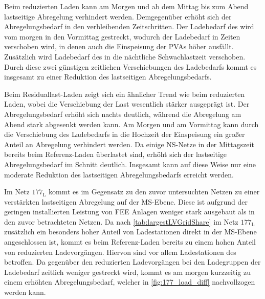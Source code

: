 Beim reduzierten Laden kann am Morgen und ab dem Mittag bis zum Abend lastseitige Abregelung verhindert werden.
Demgegenüber erhöht sich der Abregelungsbedarf in den verbleibenden Zeitschritten.
Der Ladebedarf des \UC \Firmeparkplatz wird vom morgen in den Vormittag gestreckt, wodurch der Ladebedarf in Zeiten verschoben wird, in denen auch die Einspeisung der \glspl{PVA} höher ausfällt.
Zusätzlich wird Ladebedarf des \UC \zH in die nächtliche Schwachlastzeit verschoben.
Durch diese zwei günstigen zeitlichen Verschiebungen des Ladebedarfs kommt es insgesamt zu einer Reduktion des lastseitigen Abregelungsbedarfs.



Beim Residuallast-Laden zeigt sich ein ähnlicher Trend wie beim reduzierten Laden, wobei die Verschiebung der Last wesentlich stärker ausgeprägt ist.
Der Abregelungsbedarf erhöht sich nachts deutlich, während die Abregelung am Abend stark abgesenkt werden kann.
Am Morgen und am Vormittag kann durch die Verschiebung des Ladebedarfs in die Hochzeit der Einspeisung ein großer Anteil an Abregelung verhindert werden.
Da einige \gls{NS}-Netze in der Mittagszeit bereits beim Referenz-Laden überlastet sind, erhöht sich der lastseitige Abregelungsbedarf im Schnitt deutlich.
Insgesamt kann auf diese Weise nur eine moderate Reduktion des lastseitigen Abregelungsbedarfs erreicht werden.\medskip

Im Netz \(177_{\text{L}}\) kommt es im Gegensatz zu den zuvor untersuchten Netzen zu einer verstärkten lastseitigen Abregelung auf der \gls{MS}-Ebene.
Diese ist aufgrund der geringen installierten Leistung von \gls{FEE} Anlagen weniger stark ausgebaut als in den zuvor betrachteten Netzen.
Da nach \autoref{tab:largestLVGridShare} im Netz \(177_{\text{L}}\) zusätzlich ein besonders hoher Anteil von Ladestationen direkt in der \gls{MS}-Ebene angeschlossen ist, kommt es beim Referenz-Laden bereits zu einem hohen Anteil von reduzierten Ladevorgängen.
Hiervon sind vor allem Ladestationen des \UC \Firmeparkplatz betroffen.
Da gegenüber den reduzierten Ladevorgängen bei den Ladegruppen der Ladebedarf zeitlich weniger gestreckt wird, kommt es am morgen kurzzeitig zu einem erhöhten Abregelungsbedarf, welcher in \autoref{fig:177_load_diff} nachvollzogen werden kann.



